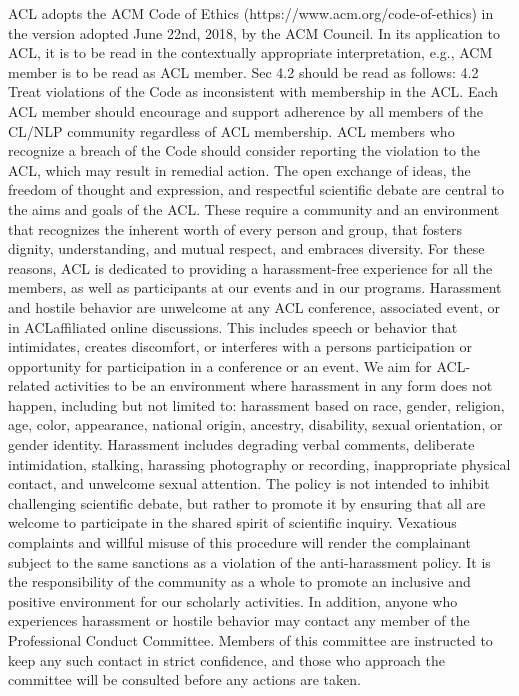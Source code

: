 ACL adopts the ACM Code of Ethics (https://www.acm.org/code-of-ethics) in the version adopted June 22nd, 2018, by the ACM Council. 
In its application to ACL, it is to be read in the contextually appropriate interpretation, e.g., ACM member is to be read as ACL member. Sec 4.2 should be read as follows: 4.2 Treat violations of the Code as inconsistent with membership in the ACL. Each ACL member should encourage and support adherence by all members of the CL/NLP community regardless of ACL membership. ACL members who recognize a breach of the Code should consider reporting the violation to the ACL, which may result in remedial action.
The open exchange of ideas, the freedom of thought and expression, and respectful scientific debate are central to the aims and goals of the ACL. These require a community and an environment that recognizes the inherent worth of every person and group, that fosters dignity, understanding, and mutual respect, and embraces diversity. For these reasons, ACL is dedicated to providing a harassment-free experience for all the members, as well as participants at our events and in our programs. Harassment and hostile behavior are unwelcome at any ACL conference, associated event, or in ACLaffiliated online discussions. This includes speech or behavior that intimidates, creates discomfort, or interferes with a persons participation or opportunity for participation in a conference or an event. We aim for ACL-related activities to be an environment where harassment in any form does not happen, including but not limited to: harassment based on race, gender, religion, age, color, appearance, national origin, ancestry, disability, sexual orientation, or gender identity. Harassment includes degrading verbal comments, deliberate intimidation, stalking, harassing photography or recording, inappropriate physical contact, and unwelcome sexual attention. The policy is not intended to inhibit challenging scientific debate, but rather to promote it by ensuring that all are welcome to participate in the shared spirit of scientific inquiry. Vexatious complaints and willful misuse of this procedure will render the complainant subject to the same sanctions as a violation of the anti-harassment policy. It is the responsibility of the community as a whole to promote an inclusive and positive environment for our scholarly activities. In addition, anyone who experiences harassment or hostile behavior may contact any member of the Professional Conduct Committee. Members of this committee are instructed to keep any such contact in strict confidence, and those who approach the committee will be consulted before any actions are taken.
